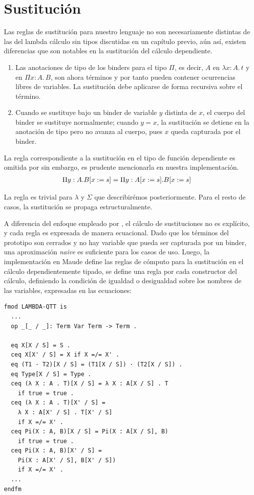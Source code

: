 \section{Sustitución}
Las reglas de sustitución para nuestro lenguaje no son necesariamente distintas de las del lambda cálculo sin tipos discutidas en un capítulo previo, aún así, existen diferencias que son notables en la sustitución del cálculo dependiente.

\begin{enumerate}
    \item Las anotaciones de tipo de los binders para el tipo $\Pi$, es decir, $A$ en $\lambda x : A.\, t$ y en $\Pi x : A.\, B$, son ahora t\'erminos y por tanto pueden contener ocurrencias libres de variables. La sustituci\'on debe aplicarse de forma recursiva sobre el término.
    \item Cuando se sustituye bajo un binder de variable $y$ distinta de $x$, el cuerpo del binder se sustituye normalmente; cuando $y = x$, la sustituci\'on se detiene en la anotaci\'on de tipo pero no avanza al cuerpo, pues $x$ queda capturada por el binder.
\end{enumerate}

La regla correspondiente a la sustitución en el tipo de función dependiente es omitida por \cite{loh2010} sin embargo, es prudente mencionarla en nuestra implementación.
\begin{align}
& \quad \Pi y : A . B[x := s] = \Pi y : A[x := s] . B[x := s] \notag
\end{align}

La regla es trivial para $\lambda$ y $\Sigma$ que describirémos posteriormente. Para el resto de casos, la sustitución se propaga estructuralmente.

\newline
\newline
\indent A diferencia del enfoque empleado por \cite{stehr}, el cálculo de sustituciones no es explícito, y cada regla es expresada de manera ecuacional. Dado que los términos del prototipo son cerrados y no hay variable que pueda ser capturada por un binder, una aproximación \textit{naive} es suficiente para los casos de uso. Luego, la implementación en Maude define las reglas de cómputo para la sustitución en el cálculo dependientemente tipado, se define una regla por cada constructor del cálculo, definiendo la condición de igualdad o desigualdad sobre los nombres de las variables, expresadas en las ecuaciones:

\begin{lstlisting}
fmod LAMBDA-QTT is
  ...
  op _[_ / _]: Term Var Term -> Term .

  eq X[X / S] = S .
  ceq X[X' / S] = X if X =/= X' .
  eq (T1 · T2)[X / S] = (T1[X / S]) · (T2[X / S]) .
  eq Type[X / S] = Type .
  ceq (λ X : A . T)[X / S] = λ X : A[X / S] . T
    if true = true .
  ceq (λ X : A . T)[X' / S] =
    λ X : A[X' / S] . T[X' / S]
    if X =/= X' .
  ceq Pi(X : A, B)[X / S] = Pi(X : A[X / S], B)
    if true = true .
  ceq Pi(X : A, B)[X' / S] =
    Pi(X : A[X' / S], B[X' / S])
    if X =/= X' .
  ...
endfm
\end{lstlisting}
